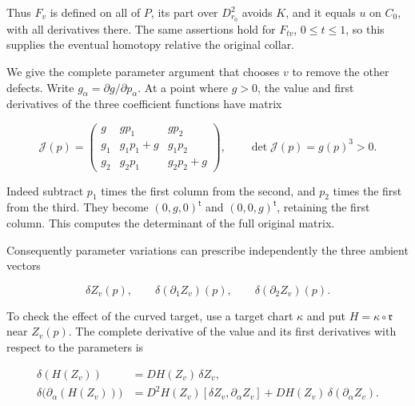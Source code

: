 Thus \(F_v\) is defined on all of \(P\), its part over \(D_{r_0}^2\) avoids \(K\), and it equals \(u\) on \(C_0\), with all derivatives there. The same assertions hold for \(F_{tv}\), \(0\leq t\leq1\), so this supplies the eventual homotopy relative the original collar.

We give the complete parameter argument that chooses \(v\) to remove the other defects. Write \(g_\alpha=\partial g/\partial p_\alpha\). At a point where \(g>0\), the value and first derivatives of the three coefficient functions have matrix

\begin{equation}
\mathcal J(p)=
\begin{pmatrix}
g&gp_1&gp_2\\
g_1&g_1p_1+g&g_1p_2\\
g_2&g_2p_1&g_2p_2+g
\end{pmatrix},
\qquad
\det\mathcal J(p)=g(p)^3>0.
\label{courseIII:belt-sphere-complements-and-the-whitney-disk:eq:5.7}
\end{equation}

Indeed subtract \(p_1\) times the first column from the second, and \(p_2\) times the first from the third. They become \((0,g,0)^{\mathsf t}\) and \((0,0,g)^{\mathsf t}\), retaining the first column. This computes the determinant of the full original matrix.

Consequently parameter variations can prescribe independently the three ambient vectors

\begin{equation}
\delta Z_v(p),\qquad
\delta(\partial_1 Z_v)(p),\qquad
\delta(\partial_2 Z_v)(p).
\label{courseIII:belt-sphere-complements-and-the-whitney-disk:eq:5.8}
\end{equation}

To check the effect of the curved target, use a target chart \(\kappa\) and put \(H=\kappa\circ\mathfrak r\) near \(Z_v(p)\). The complete derivative of the value and its first derivatives with respect to the parameters is

\begin{equation}
\begin{aligned}
\delta(H(Z_v))&=DH(Z_v)\,\delta Z_v,\\
\delta\bigl(\partial_\alpha(H(Z_v))\bigr)
&=D^2H(Z_v)[\delta Z_v,\partial_\alpha Z_v]
 +DH(Z_v)\,\delta(\partial_\alpha Z_v).
\end{aligned}
\label{courseIII:belt-sphere-complements-and-the-whitney-disk:eq:5.9}
\end{equation}

